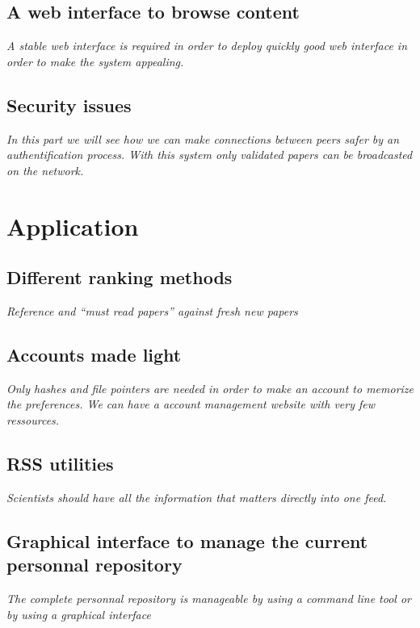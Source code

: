 \subsection{A web interface to browse content}

\textit{A stable web interface is required in order to
deploy quickly good web interface in order to make the system
appealing.}

\subsection{Security issues}

\textit{In this part we will see how we can make connections
between peers safer by an authentification process. With this
system only validated papers can be broadcasted on the network.}

\section{Application}

\subsection{Different ranking methods}

\textit{Reference and ``must read papers'' against fresh new papers}

\subsection{Accounts made light}

\textit{Only hashes and file pointers are needed in order to make an
account to memorize the preferences. We can have a account management
website with very few ressources.}

\subsection{RSS utilities}

\textit{Scientists should have all the information that matters directly into
one feed.}

\subsection{Graphical interface to manage the current personnal repository}

\textit{The complete personnal repository is manageable by using a command line
tool or by using a graphical interface}


